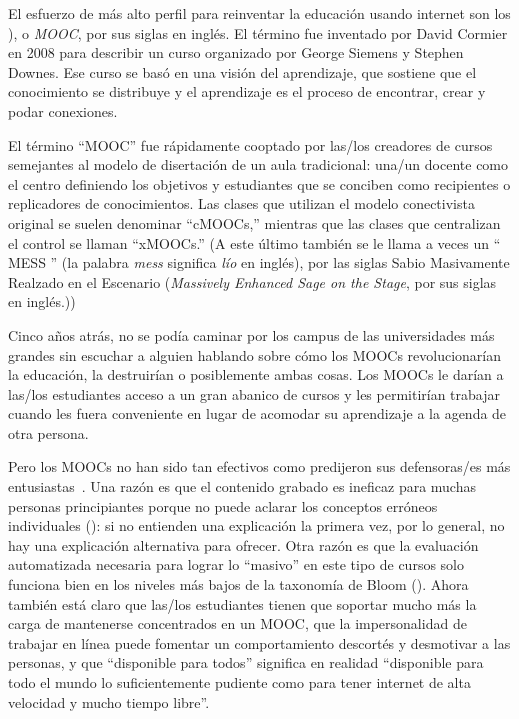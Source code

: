
El esfuerzo de más alto perfil para reinventar la educación usando internet
son los ), o \emph{MOOC}, por sus siglas en inglés.
El término fue inventado por David Cormier en 2008
para describir un curso organizado por George Siemens
y Stephen Downes.
Ese curso se basó en una visión  del aprendizaje,
que sostiene que el conocimiento se distribuye
y el aprendizaje es el proceso de encontrar, crear y podar conexiones.

El término ``MOOC'' fue rápidamente cooptado por las/los creadores de
cursos semejantes al modelo de disertación de un aula tradicional:
una/un docente como el centro definiendo los objetivos
y estudiantes que se conciben como recipientes o replicadores de conocimientos.
Las clases que utilizan el modelo conectivista original se suelen denominar ``cMOOCs,''
mientras que las clases que centralizan el control se llaman ``xMOOCs.''
(A este último también se le llama a veces un `` MESS '' (la palabra \emph{mess} significa \emph{lío} en inglés),
por las siglas Sabio Masivamente Realzado en el Escenario (\emph{Massively Enhanced Sage on the Stage}, por sus siglas en inglés.))

Cinco años atrás,
no se podía caminar por los campus de las universidades más grandes
sin escuchar a alguien hablando sobre cómo los MOOCs revolucionarían la educación,
la destruirían
o posiblemente ambas cosas.
Los MOOCs le darían a las/los estudiantes acceso a un gran abanico de cursos
y les permitirían trabajar cuando les fuera conveniente
en lugar de acomodar su aprendizaje a la agenda de otra persona.

Pero los MOOCs no han sido tan efectivos
como predijeron sus defensoras/es más entusiastas~\cite{Ubel2017}.
Una razón es que
el contenido grabado es ineficaz para muchas personas principiantes
porque no puede aclarar los conceptos erróneos individuales ():
si no entienden una explicación la primera vez,
por lo general, no hay una explicación alternativa para ofrecer.
Otra razón es que la evaluación automatizada necesaria para lograr lo ``masivo'' en este tipo de cursos
solo funciona bien en los niveles más bajos de la taxonomía de Bloom ().
Ahora también está claro que
las/los estudiantes tienen que soportar mucho más la carga de mantenerse concentrados en un MOOC,
que la impersonalidad de trabajar en línea puede fomentar un comportamiento descortés y desmotivar a las personas,
y que ``disponible para todos'' significa en realidad
``disponible para todo el mundo lo suficientemente pudiente como para tener internet de alta velocidad y mucho tiempo libre''.


